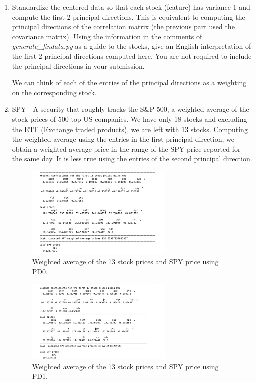 \documentclass[12pt,twoside]{article}
\begin{document}
\begin{enumerate}
\begin{enumerate}
  \item Standardize the centered data so that each stock (feature) has
    variance 1 and compute the first 2 principal directions.  This is
    equivalent to computing the principal directions of the
    correlation matrix (the previous part used the covariance
    matrix).  Using the information in the comments of
   \emph{generate\_findata.py} as a guide to the stocks, 
    give an English interpretation of the first 2 principal directions
    computed here. 
    You are not required to include the principal directions in
    your submission.
     
    We can think of each of the entries of the principal directions as a weighting on the corresponding stock.  
    	\bi
    		\item SPY - A security that roughly tracks the S\&P 500, a weighted average of the stock prices of 500 top US companies.
		We have only 18 stocks and excluding the ETF (Exchange traded products), we are left with 13 stocks. 
		Computing the  weighted average using the entries in the first principal direction, we obtain a weighted average price
		in the range of the SPY price reported for the same day. It is less true using the entries of the second principal direction.
		
		\begin{figure}[H]
			\centering
			\includegraphics[width=200pt]{figures/pb_3_b_1.png}
			\caption{Weighted average of the 13 stock prices and SPY price using PD0.}
			\label{fig2}
		\end{figure}
			
		\begin{figure}[H]
			\centering
			\includegraphics[width=200pt]{figures/pb_3_b_2.png}
			\caption{Weighted average of the 13 stock prices and SPY price using PD1.}
			\label{fig3}
		\end{figure}
			

\end{enumerate}
\end{enumerate}
\end{document}
